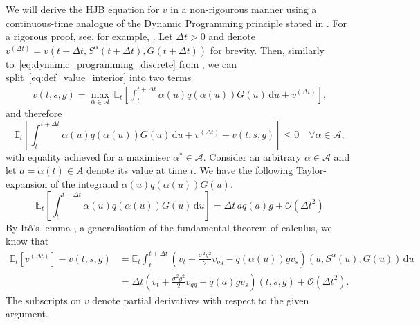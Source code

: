 \documentclass[main.tex]{subfiles}
\begin{document}
We will derive the HJB equation for $v$ in a non-rigourous manner
using a
continuous-time analogue of the Dynamic Programming principle
stated in . For a rigorous proof,
see, for example, \citet[Ch.~3]{pham2009continuous}.
Let $\Delta{t}>0$ and denote $v^{(\Delta{t})} =
v(t+\Delta{t},S^\alpha(t+\Delta{t}),G(t+\Delta{t}))$ for brevity.
Then, similarly to~\eqref{eq:dynamic_programming_discrete} from
, we can
split~\eqref{eq:def_value_interior} into two terms
\begin{align}
  v(t,s,g) = \max_{\alpha\in\mathcal{A}}\,
  \mathbb{E}_{t}\left[
  \int_t^{t+\Delta{t}} \alpha(u)q(\alpha(u))G(u)\,\mathrm{d}u
  + v^{(\Delta{t})}\right],
\end{align}
and therefore
\begin{equation}
  \label{eq:cts_bellman_principle_ineq}
  \mathbb{E}_{t}\left[
    \int_t^{t+\Delta{t}} \alpha(u)q(\alpha(u))G(u)\,\mathrm{d}u
    + v^{(\Delta{t})}-v(t,s,g)\right]
  \leq 0\quad  \forall \alpha\in\mathcal{A},
\end{equation}
with equality achieved for a maximiser $\alpha^*\in\mathcal{A}$.
Consider an arbitrary $\alpha\in\mathcal{A}$ and let $a=\alpha(t)\in
A$ denote its value at time $t$.
We have the following Taylor-expansion of the
integrand $\alpha(u)q(\alpha(u))G(u)$.
\begin{equation}
  \mathbb{E}_{t}\left[
    \int_t^{t+\Delta{t}}
    \alpha(u)q(\alpha(u))G(u)\,\mathrm{d}u\right]
  = \Delta{t}\,aq(a)g  + \mathcal{O}({\Delta{t}}^2)
\end{equation}
By It\^{o}'s lemma \citep[Ch.~1]{pham2009continuous}, a
generalisation of the fundamental theorem of calculus, we know that
\begin{align}
  \mathbb{E}_t[v^{(\Delta{t})}]-v(t,s,g)
  &= \mathbb{E}_t  \int_t^{t+\Delta{t}}
    (v_t
    +{\textstyle\frac{\sigma^2g^2}{2}}
    v_{gg}
    -q(\alpha(u))g v_s)(u,S^{\alpha}(u),G(u))
    \,\mathrm{d}u\\
  &= \Delta{t}\left( v_t
    +{\textstyle\frac{\sigma^2g^2}{2}}
    v_{gg}
    -q(a)g v_s \right)(t,s,g) + \mathcal{O}({\Delta{t}}^2).
\end{align}
The subscripts on $v$ denote partial derivatives with respect to the
given argument.
\end{document}
